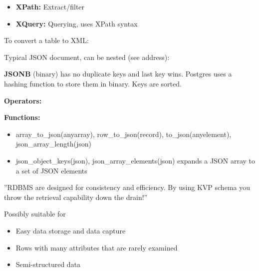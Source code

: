 \begin{breakbox}

\begin{itemize}
	\item \textbf{XPath:} Extract/filter
	\item \textbf{XQuery:} Querying, uses XPath syntax
\end{itemize}

To convert a table to XML:

\end{breakbox}

\begin{breakbox}

Typical JSON document, can be nested (see address):

\textbf{JSONB} (binary) has no duplicate keys and last key wins. Postgres uses a hashing function to store them in binary. Keys are sorted.

\textbf{Operators:}

\textbf{Functions:}
	\begin{itemize}
		\item array\_to\_json(anyarray), row\_to\_json(record), to\_json(anyelement), json\_array\_length(json)
		\item json\_object\_keys(json), json\_array\_elements(json) expands a JSON array to a set of JSON elements
	\end{itemize}
\end{breakbox}

\begin{breakbox}
\end{breakbox}

\begin{breakbox}

''RDBMS are designed for consistency and efficiency. By using KVP schema you throw the retrieval capability down the drain!''

Possibly suitable for
\begin{itemize}
	\item Easy data storage and data capture
	\item Rows with many attributes that are rarely examined
	\item Semi-structured data
\end{itemize}

\end{breakbox}